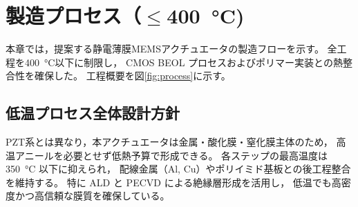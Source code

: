 \section{製造プロセス（$\leq$\SI{400}{\celsius})}

本章では，提案する静電薄膜MEMSアクチュエータの製造フローを示す。
全工程を\SI{400}{\celsius}以下に制限し，
CMOS BEOL プロセスおよびポリマー実装との熱整合性を確保した。
工程概要を図\ref{fig:process}に示す。

\subsection{低温プロセス全体設計方針}
PZT系とは異なり，本アクチュエータは金属・酸化膜・窒化膜主体のため，
高温アニールを必要とせず低熱予算で形成できる。
各ステップの最高温度は \SI{350}{\celsius} 以下に抑えられ，
配線金属（Al, Cu）やポリイミド基板との後工程整合を維持する。
特に ALD と PECVD による絶縁層形成を活用し，
低温でも高密度かつ高信頼な膜質を確保している。

